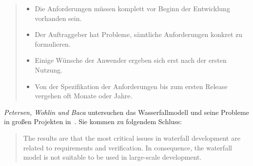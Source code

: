 \blockquote[{\cite[323]{AABG14n}}]{
    \begin{itemize}
        \item Die Anforderungen müssen komplett vor Beginn der Entwicklung vorhanden
        sein.
        \item Der Auftraggeber hat Probleme, sämtliche Anforderungen konkret zu formulieren.
        \item Einige Wünsche der Anwender ergeben sich erst nach der ersten Nutzung.
        \item Von der Spezifikation der Anforderungen bis zum ersten Release vergehen oft
        Monate oder Jahre.
    \end{itemize}
}

\noindent
\textit{Petersen, Wohlin und Baca} untersuchen das Wasserfallmodell und seine Probleme in großen Projekten in~\cite{PWB09}.
Sie kommen zu folgendem Schluss:

\blockquote[{\cite[15]{PWB09}}]{
    The results are that the most critical issues in waterfall development
    are related to requirements and verification. In consequence, the waterfall model
    is not suitable to be used in large-scale development.
}